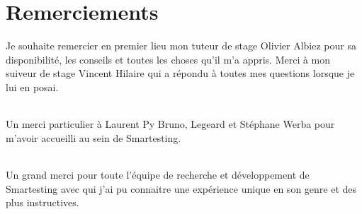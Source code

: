 \chapter*{Remerciements}

Je souhaite remercier en premier lieu mon tuteur de stage Olivier Albiez pour sa disponibilité, les conseils et toutes les choses qu'il m'a appris. Merci à mon suiveur de stage Vincent Hilaire qui a répondu à toutes mes questions lorsque je lui en posai.

\subparagraph*{}
Un merci particulier à Laurent Py Bruno, Legeard et Stéphane Werba pour m'avoir accueilli au sein de Smartesting.

\subparagraph*{}
Un grand merci pour toute l'équipe de recherche et développement de Smartesting avec qui j'ai pu connaitre une expérience unique en son genre et des plus instructives.


